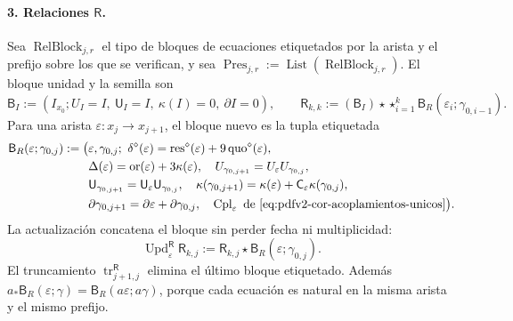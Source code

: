 \paragraph{3. Relaciones \(\mathsf R\).}
Sea \(\operatorname{RelBlock}_{j,r}\) el tipo de bloques de ecuaciones
etiquetados por la arista y el prefijo sobre los que se verifican, y sea
\(\operatorname{Pres}_{j,r}:=\operatorname{List}
(\operatorname{RelBlock}_{j,r})\). El bloque unidad y la semilla son
\begin{equation}
\label{eq:pdfv2-terminal-semilla-r}
 \mathsf B_I:=(I_{x_0};U_I=I,\ \mathsf U_I=I,\ \kappa(I)=0,\ \partial I=0),
 \qquad
 \mathsf R_{k,k}:=(\mathsf B_I)\star
 \mathop{\star}_{i=1}^{k}
 \mathsf B_R(\varepsilon_i;\gamma_{0,i-1}).
\end{equation}
Para una arista \(\varepsilon:x_j\to x_{j+1}\), el bloque nuevo es la
tupla etiquetada
\begin{equation}
\label{eq:pdfv2-terminal-bloque-r}
 \begin{split}
 \mathsf B_R(\varepsilon;\gamma_{0,j}):=\bigl(
 &\varepsilon,\gamma_{0,j};\ 
 \delta^\diamond(\varepsilon)
 =\operatorname{res}^\diamond(\varepsilon)
  +9\operatorname{quo}^\diamond(\varepsilon),\\
 &\Delta(\varepsilon)=\operatorname{or}(\varepsilon)
  +3\kappa(\varepsilon),\quad
 U_{\gamma_{0,j+1}}=U_\varepsilon U_{\gamma_{0,j}},\\
 &\mathsf U_{\gamma_{0,j+1}}
 =\mathsf U_\varepsilon\mathsf U_{\gamma_{0,j}},\quad
 \kappa(\gamma_{0,j+1})
 =\kappa(\varepsilon)+\mathsf C_\varepsilon\kappa(\gamma_{0,j}),\\
 &\partial\gamma_{0,j+1}
 =\partial\varepsilon+\partial\gamma_{0,j},\quad
 \operatorname{Cpl}_\varepsilon
 \text{ de }\eqref{eq:pdfv2-cor-acoplamientos-unicos}
 \bigr).
 \end{split}
\end{equation}
La actualización concatena el bloque sin perder fecha ni multiplicidad:
\begin{equation}
\label{eq:pdfv2-terminal-update-r}
 \operatorname{Upd}^{\mathsf R}_{\varepsilon}\mathsf R_{k,j}
 :=\mathsf R_{k,j}\star\mathsf B_R(\varepsilon;\gamma_{0,j}).
\end{equation}
El truncamiento \(\operatorname{tr}^{\mathsf R}_{j+1,j}\) elimina el último
bloque etiquetado. Además
\(a_*\mathsf B_R(\varepsilon;\gamma)
=\mathsf B_R(a\varepsilon;a\gamma)\), porque cada ecuación es natural en
la misma arista y el mismo prefijo.

